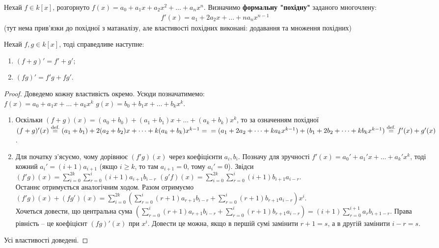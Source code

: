 \documentclass{math_library}
\begin{document}
\begin{definition}
Нехай $f \in k[x]$, розгорнуто $f(x) = a_0 + a_1 x + a_2 x^2 + \dots + a_n x^n$. Визначимо \textbf{формальну "похідну"} заданого многочлену:
\begin{align*}
f'(x) = a_1 + 2a_2 x + \dots + n a_n x^{n-1}
\end{align*}
(тут нема прив'язки до похідної з матаналізу, але властивості похідних виконані: додавання та множення похідних)
\end{definition}

\begin{proposition}
Нехай $f,g \in k[x]$, тоді справедливе наступне:
\begin{enumerate}[nosep,wide=0pt,label={\arabic*)}]
\item $(f+g)' = f' + g'$;
\item $(fg)' = f'g + fg'$.
\end{enumerate}
\end{proposition}

\begin{proof}
Доведемо кожну властивість окремо. Усюди позначатимемо:\\
$f(x) = a_0 + a_1 x + \dots + a_k x^k$ \qquad $g(x) = b_0 + b_1 x + \dots + b_k x^k$.
\begin{enumerate}[wide=0pt,label={\arabic*)}]
\item Оскільки $(f+g)(x) = (a_0+b_0) + (a_1+b_1)x + \dots + (a_k+b_k)x^k$, то за означенням похідної\\
$(f+g)'(x) \overset{\text{def.}}{=} (a_1 + b_1) + 2(a_2 + b_2)x + \dots + k(a_k + b_k)x^{k-1} = \\ = (a_1 + 2a_2 + \dots + k a_kx^{k-1}) + (b_1 + 2b_2 + \dots + k b_kx^{k-1}) \overset{\text{def.}}{=} f'(x) + g'(x)$.

\item Для початку з'ясуємо, чому дорівнює $(f'g)(x)$ через коефіцієнти $a_i,b_i$. Позначу для зручності $f'(x) = a_0' + a_1' x + \dots + a_k' x^k$, тоді кожний $a_i' = (i+1) a_{i+1}$ (якщо $i \geq k$, то там $a_{i+1} = 0$, тому $a_i' = 0$). Звідси\\
$(f'g)(x) = \displaystyle\sum_{i=0}^{2k} \sum_{r=0}^i (i+1)a_{i+1} b_{i-r}$ \qquad $(g'f)(x) = \displaystyle\sum_{i=0}^{2k} \sum_{r=0}^i (i+1)b_{i+1} a_{i-r}$.\\
Останнє отримується аналогічним ходом. Разом отримуємо\\
$(f'g)(x) + (fg')(x) = \displaystyle\sum_{i=0}^{2k} \left( \sum_{r=0}^i (r+1)a_{r+1} b_{i-r} + \sum_{r=0}^i (r+1)b_{r+1} a_{i-r} \right) x^i$.\\
Хочеться довести, що центральна сума $\displaystyle\left( \sum_{r=0}^i (r+1)a_{r+1} b_{i-r} + \sum_{r=0}^i (r+1)b_{r+1} a_{i-r} \right) = (i+1) \sum_{r=0}^{i+1} a_r b_{i+1-r}$. Права рівність -- це коефіцієнт $(fg)'(x)$ при $x^i$. Довести це можна, якщо в першій сумі замінити $r+1 = s$, а в другій замінити $i-r = s$. 
\end{enumerate}
Усі властивості доведені.
\end{proof}
\end{document}
